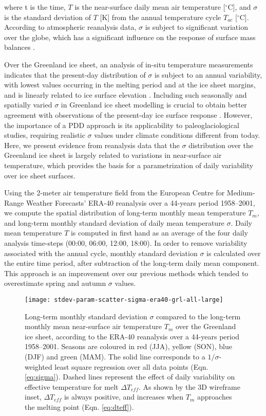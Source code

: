 \documentclass[review]{igs}
\begin{document}
where t is the time, $T$ is the near-surface daily mean air temperature [$^\circ$C], and $\sigma$ is the standard deviation of $T$ [K] from the annual temperature cycle $T_{ac}$ [$^\circ$C]. According to atmospheric reanalysis data, $\sigma$ is subject to significant variation over the globe, which has a significant influence on the response of surface mass balances \citep{seguinot-2013}.

Over the Greenland ice sheet, an analysis of in-situ temperature measurements indicates that the present-day distribution of $\sigma$ is subject to an annual variability, with lowest values occurring in the melting period and at the ice sheet margins, and is linearly related to ice surface elevation \citep{fausto-etal-2009,fausto-etal-2011}. Including such seasonally and spatially varied $\sigma$ in Greenland ice sheet modelling is crucial to obtain better agreement with observations of the present-day ice surface response \citep{rogozhina-rau-inpress}. However, the importance of a PDD approach is its applicability to paleoglaciological studies, requiring realistic $\sigma$ values under climate conditions different from today. Here, we present evidence from reanalysis data that the $\sigma$ distribution over the Greenland ice sheet is largely related to variations in near-surface air temperature, which provides the basis for a parametrization of daily variability over ice sheet surfaces.

Using the 2-meter air temperature field from the European Centre for Medium-Range Weather Forecasts’ ERA-40 reanalysis \citep{uppala-etal-2005} over a 44-years period 1958--2001, we compute the spatial distribution of long-term monthly mean temperature $T_{m}$, and long-term monthly standard deviation of daily mean temperature $\sigma$. Daily mean temperature $T$ is computed in first hand as an average of the four daily analysis time-steps (00:00, 06:00, 12:00, 18:00). In order to remove variability associated with the annual cycle, monthly standard deviation $\sigma$ is calculated over the entire time period, after subtraction of the long-term daily mean component. This approach is an improvement over our previous methods \citep{seguinot-2013,rogozhina-rau-inpress} which tended to overestimate spring and autumn $\sigma$ values.

\begin{figure*}
    \centering\texttt{[image: stdev-param-scatter-sigma-era40-grl-all-large]}
    \caption{Long-term monthly standard deviation $\sigma$ compared to the long-term monthly mean near-surface air temperature $T_{m}$ over the Greenland ice sheet, according to the ERA-40 reanalysis \citep{uppala-etal-2005} over a 44-years period 1958–2001. Seasons are coloured in red (JJA), yellow (SON), blue (DJF) and green (MAM). The solid line corresponds to a $1/\sigma$-weighted least square regression over all data points (Eqn. \ref{eq:sigma}). Dashed lines represent the effect of daily variability on effective temperature for melt $\Delta T_{eff}$. As shown by the 3D wireframe inset, $\Delta T_{eff}$ is always positive, and increases when $T_{m}$ approaches the melting point (Eqn. \ref{eq:dteff}).}
    \label{fig:grl}
\end{figure*}
\end{document}

